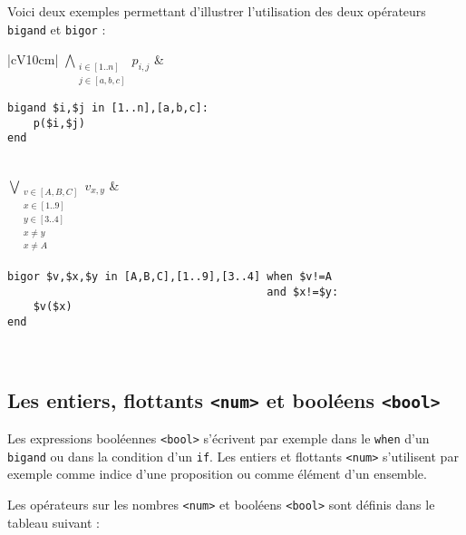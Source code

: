 Voici deux exemples permettant d'illustrer l'utilisation des deux opérateurs \texttt{bigand} et \texttt{bigor} :

\begin{center}
\begin{tabular}{|cV{10cm}|} \hline
$\bigwedge\limits_{\substack{i\in [1..n]\\j \in [a,b,c]}} p_{i,j}$ & 
\begin{verbatim}
bigand $i,$j in [1..n],[a,b,c]:
    p($i,$j)
end
\end{verbatim}
\\ \hline
$\bigvee\limits_{\substack{v\in [A,B,C]\\x \in [1..9]\\y\in[3..4]\\x \ne y \\ x \ne A\\}} v_{x,y}$ &
\begin{verbatim}
bigor $v,$x,$y in [A,B,C],[1..9],[3..4] when $v!=A 
                                        and $x!=$y:
    $v($x)
end
\end{verbatim} 
\\ \hline
\end{tabular}
\end{center}


\subsection{Les entiers, flottants \texttt{<num>} et booléens \texttt{<bool>}}

Les expressions booléennes \texttt{<bool>} s'écrivent par exemple dans le \texttt{when} d'un \texttt{bigand} ou dans la condition d'un \texttt{if}. Les entiers et flottants \texttt{<num>} s'utilisent par exemple comme indice d'une proposition ou comme élément d'un ensemble.

Les opérateurs sur les nombres \texttt{<num>} et booléens \texttt{<bool>} sont définis dans le tableau suivant :

